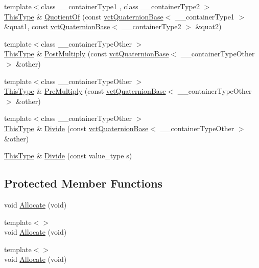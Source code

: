 \begin{DoxyCompactItemize}
\item 
{\footnotesize template$<$class \-\_\-\-\_\-container\-Type1 , class \-\_\-\-\_\-container\-Type2 $>$ }\\\hyperlink{classvct_quaternion_base_af28efdc38acf89acb7a67afada11408c}{This\-Type} \& \hyperlink{classvct_quaternion_base_a85152e0fee1a3184cbfb7e8d1afaa959}{Quotient\-Of} (const \hyperlink{classvct_quaternion_base}{vct\-Quaternion\-Base}$<$ \-\_\-\-\_\-container\-Type1 $>$ \&quat1, const \hyperlink{classvct_quaternion_base}{vct\-Quaternion\-Base}$<$ \-\_\-\-\_\-container\-Type2 $>$ \&quat2)
\item 
{\footnotesize template$<$class \-\_\-\-\_\-container\-Type\-Other $>$ }\\\hyperlink{classvct_quaternion_base_af28efdc38acf89acb7a67afada11408c}{This\-Type} \& \hyperlink{classvct_quaternion_base_abc69080b11a4e42fd7f6d018a18103cb}{Post\-Multiply} (const \hyperlink{classvct_quaternion_base}{vct\-Quaternion\-Base}$<$ \-\_\-\-\_\-container\-Type\-Other $>$ \&other)
\item 
{\footnotesize template$<$class \-\_\-\-\_\-container\-Type\-Other $>$ }\\\hyperlink{classvct_quaternion_base_af28efdc38acf89acb7a67afada11408c}{This\-Type} \& \hyperlink{classvct_quaternion_base_ab9b8449e0e07924a726e9cadf79bef70}{Pre\-Multiply} (const \hyperlink{classvct_quaternion_base}{vct\-Quaternion\-Base}$<$ \-\_\-\-\_\-container\-Type\-Other $>$ \&other)
\item 
{\footnotesize template$<$class \-\_\-\-\_\-container\-Type\-Other $>$ }\\\hyperlink{classvct_quaternion_base_af28efdc38acf89acb7a67afada11408c}{This\-Type} \& \hyperlink{classvct_quaternion_base_ab3979bd4ea84a91954df45c38cab1a59}{Divide} (const \hyperlink{classvct_quaternion_base}{vct\-Quaternion\-Base}$<$ \-\_\-\-\_\-container\-Type\-Other $>$ \&other)
\item 
\hyperlink{classvct_quaternion_base_af28efdc38acf89acb7a67afada11408c}{This\-Type} \& \hyperlink{classvct_quaternion_base_ade85802b9a8af92f33c757a8f42ddc11}{Divide} (const value\-\_\-type s)
\end{DoxyCompactItemize}
\subsection*{Protected Member Functions}
\begin{DoxyCompactItemize}
\item 
void \hyperlink{classvct_quaternion_base_a47d79dd8cd6d9f4b0b017ab131aa04d7}{Allocate} (void)
\item 
{\footnotesize template$<$$>$ }\\void \hyperlink{classvct_quaternion_base_ac25cdbaa9860eda94adebf81cc6953db}{Allocate} (void)
\item 
{\footnotesize template$<$$>$ }\\void \hyperlink{classvct_quaternion_base_a14aff972881623f33d31bf8c7b20462b}{Allocate} (void)
\end{DoxyCompactItemize}


